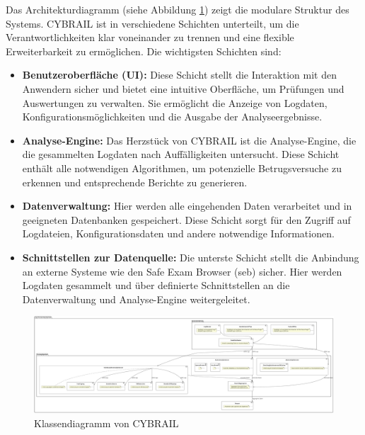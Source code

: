 Das Architekturdiagramm (siehe Abbildung \ref{fig:klassendiagramm}) zeigt die modulare Struktur des Systems. 
CYBRAIL ist in verschiedene Schichten unterteilt, um die Verantwortlichkeiten klar voneinander zu trennen und eine flexible Erweiterbarkeit zu ermöglichen. Die wichtigsten Schichten sind:

\begin{itemize} 
\item \textbf{Benutzeroberfläche (UI):} Diese Schicht stellt die Interaktion mit den Anwendern sicher und bietet eine intuitive Oberfläche, um Prüfungen und Auswertungen zu verwalten. 
Sie ermöglicht die Anzeige von Logdaten, Konfigurationsmöglichkeiten und die Ausgabe der Analyseergebnisse. 
\item \textbf{Analyse-Engine:} Das Herzstück von CYBRAIL ist die Analyse-Engine, die die gesammelten Logdaten nach Auffälligkeiten untersucht. 
Diese Schicht enthält alle notwendigen Algorithmen, um potenzielle Betrugsversuche zu erkennen und entsprechende Berichte zu generieren. 
\item \textbf{Datenverwaltung:} Hier werden alle eingehenden Daten verarbeitet und in geeigneten Datenbanken gespeichert. 
Diese Schicht sorgt für den Zugriff auf Logdateien, Konfigurationsdaten und andere notwendige Informationen. 
\item \textbf{Schnittstellen zur Datenquelle:} Die unterste Schicht stellt die Anbindung an externe Systeme wie den Safe Exam Browser (\gls{seb}) sicher. 
Hier werden Logdaten gesammelt und über definierte Schnittstellen an die Datenverwaltung und Analyse-Engine weitergeleitet. \end{itemize}

\begin{landscape}
\begin{figure}[h]
    \centering
    \includegraphics[width=1.5\textwidth]{figures/CybrailArchitektur.pdf}
    \caption{Klassendiagramm von CYBRAIL}
        \label{fig:klassendiagramm}
\end{figure}
\end{landscape}

